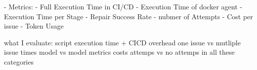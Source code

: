 - Metrics:
- Full Execution Time in CI/CD
- Execution Time of docker agent
- Execution Time per Stage
- Repair Success Rate
- nubmer of Attempts
- Cost per issue
- Token Usage




what I evaluate:
script execution time + CICD overhead
one issue vs mutliple issue times
model vs model metrics 
costs
attemps vs no attemps in all these categories